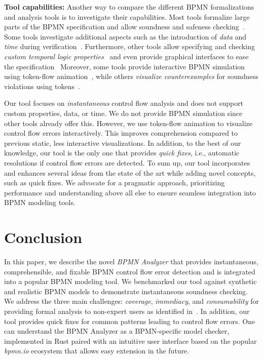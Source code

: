\documentclass[
twocolumn
]{ceurart}
\begin{document}
\textbf{Tool capabilities:}
Another way to compare the different BPMN formalizations and analysis tools is to investigate their capabilities.
Most tools formalize large parts of the BPMN specification and allow soundness and safeness checking~\cite{corradiniFormalApproachAnalysis2021,houhouFirstOrderLogicVerification2022,krauterFormalizationAnalysisBPMN2023,krauterHigherorderTransformationApproach2024}.
Some tools investigate additional aspects such as the introduction of \textit{data} and \textit{time} during verification~\cite{corradiniFormalisingAnimatingMultiple2022,houhouFirstOrderLogicVerification2022}.
Furthermore, other tools allow specifying and checking \textit{custom temporal logic properties}~\cite{corradiniFormalApproachAnalysis2021,krauterFormalizationAnalysisBPMN2023} and even provide graphical interfaces to ease the specification~\cite{krauterHigherorderTransformationApproach2024}
Moreover, some tools provide interactive BPMN simulation using token-flow animation~\cite{camundaservicesgmbhBpmnjsTokenSimulation2024,corradiniFormalisingAnimatingMultiple2022}, while others \textit{visualize counterexamples} for soundness violations using tokens~\cite{houhouFirstOrderLogicVerification2022}.

Our tool focuses on \textit{instantaneous} control flow analysis and does not support custom properties, data, or time.
We do not provide BPMN simulation since other tools already offer this.
However, we use token-flow animation to visualize control flow errors interactively.
This improves comprehension compared to previous static, less interactive visualizations.
In addition, to the best of our knowledge, our tool is the only one that provides \textit{quick fixes}, i.e., automatic resolutions if control flow errors are detected.
To sum up, our tool incorporates and enhances several ideas from the state of the art while adding novel concepts, such as quick fixes.
We advocate for a pragmatic approach, prioritizing performance and understanding above all else to ensure seamless integration into BPMN modeling tools.

\section{Conclusion} \label{sec:conclusion}

In this paper, we describe the novel \textit{BPMN Analyzer} that provides instantaneous, comprehensible, and fixable BPMN control flow error detection and is integrated into a popular BPMN modeling tool.
We benchmarked our tool against synthetic and realistic BPMN models to demonstrate instantaneous soundness checking.
We address the three main challenges: \textit{coverage}, \textit{immediacy}, and \textit{consumability} for providing formal analysis to non-expert users as identified in~\cite{fahlandAnalysisDemandInstantaneous2011}.
In addition, our tool provides quick fixes for common patterns leading to control flow errors.
One can understand the BPMN Analyzer as a BPMN-specific model checker, implemented in Rust paired with an intuitive user interface based on the popular \textit{bpmn.io} ecosystem that allows easy extension in the future.



\end{document}
